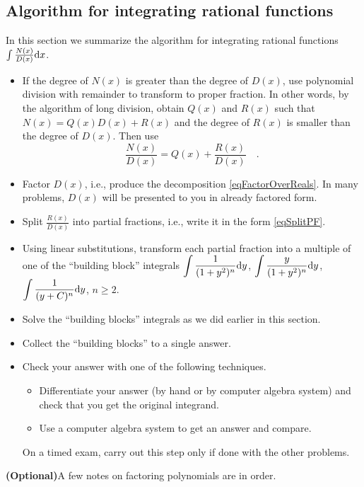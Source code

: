 \documentclass[12pt]{book}
\newcommand{\optionalMaterial}{\textbf{(Optional)}}
\begin{document}
\subsection{Algorithm for integrating rational functions}
In this section we summarize the algorithm for integrating rational functions $\int \frac{N(x)}{D(x)}{\normalfont \text{d}} x$.
\begin{itemize}
\item If the degree of $N(x)$ is greater than the degree of $D(x)$, use polynomial division with remainder to transform to proper fraction. In other words, by the algorithm of long division, obtain $Q(x)$ and $R(x)$ such that $N(x)= Q(x)D(x)+R(x)$ and the degree of $R(x)$ is smaller than the degree of $D(x)$. Then use
\[
\frac{N(x)}{D(x)}=Q(x) +\frac{R(x)}{D(x)}\quad .
\]
\item Factor $D(x)$, i.e., produce the decomposition \eqref{eqFactorOverReals}. In many problems, $D(x)$ will be presented to you in already factored form.
\item Split $\frac{R(x)}{D(x)}$ into partial fractions, i.e., write it in the form \eqref{eqSplitPF}.
\item Using linear substitutions, transform each partial fraction into a multiple of one of the ``building block'' integrals $\displaystyle \int \frac{1}{(1+y^2)^n}{\normalfont \text{d}} y$, $\displaystyle \int \frac{y}{(1+y^2)^n}{\normalfont \text{d}} y$, $\displaystyle \int \frac{1}{(y+C)^n}{\normalfont \text{d}} y$, $n\geq 2$.
\item Solve the ``building blocks'' integrals as we did earlier in this section.
\item Collect the ``building blocks'' to a single answer.
\item Check your answer with one of the following techniques.
\begin{itemize}
\item Differentiate your answer (by hand or by computer algebra system) and check that you get the original integrand.
\item Use a computer algebra system to get an answer and compare.
\end{itemize}
On a timed exam, carry out this step only if done with the other problems.
\end{itemize}
\optionalMaterial A few notes on factoring polynomials are in order.
\end{document}
